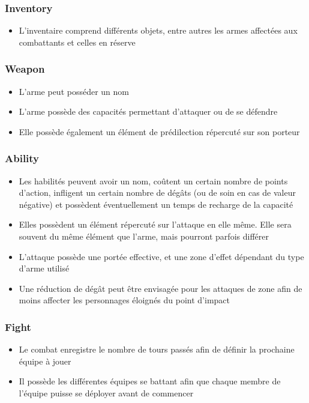 \documentclass[a4paper,12pt]{article}
\begin{document}
\subsubsection{Inventory}
\begin{itemize}
\item L'inventaire comprend différents objets, entre autres les armes affectées aux combattants et celles en réserve
\end{itemize}

\subsubsection{Weapon}
\begin{itemize}
\item L'arme peut posséder un nom
\item L'arme possède des capacités permettant d'attaquer ou de se défendre
\item Elle possède également un élément de prédilection répercuté sur son porteur
\end{itemize}

\subsubsection{Ability}
\begin{itemize}
\item Les habilités peuvent avoir un nom, coûtent un certain nombre de points d'action, infligent un certain nombre de dégâts (ou de soin en cas de valeur négative) et possèdent éventuellement un temps de recharge de la capacité
\item Elles possèdent un élément répercuté sur l'attaque en elle même. Elle sera souvent du même élément que l'arme, mais pourront parfois différer
\item L'attaque possède une portée effective, et une zone d'effet dépendant du type d'arme utilisé
\item Une réduction de dégât peut être envisagée pour les attaques de zone afin de moins affecter les personnages éloignés du point d'impact
\end{itemize}

\subsubsection{Fight}
\begin{itemize}
\item Le combat enregistre le nombre de tours passés afin de définir la prochaine équipe à jouer
\item Il possède les différentes équipes se battant afin que chaque membre de l'équipe puisse se déployer avant de commencer
\end{itemize}
\end{document}
